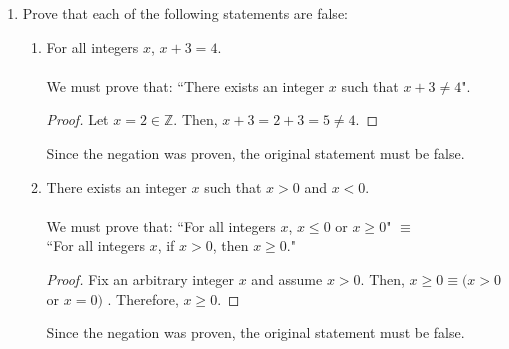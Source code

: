 \documentclass{article}
\begin{document}
\begin{enumerate}
\begin{enumerate}
    			\item There exists an integer $x$ such that, for all integers $y$, $y + x = y$.
                        \begin{proof}
                            Fix an arbitrary integer $y$. Let $x = 0 \in \mathbb{Z}$. Then,
                            \begin{alignat*}{2}
                                x &= y + (\minus y)         &\qquad &\textrm{by Axiom 1d.}  \\
                                \textrm{Hence, } x + y &= y + (\minus y) + y &\qquad &\textrm{by adding '$y$' to both sides}\\
                                x + y &= y + 0              &\qquad &\textrm{by Axiom 1d}  \\
                                x + y &= y                  &\qquad &\textrm{by Axiom 1c}  \\
                                y + x &= y                  &\qquad &\textrm{by Axiom 1a.}  
                            \end{alignat*}
                        \end{proof}
                        
    		\end{enumerate}

    	\item Prove that each of the following statements are false:
    		\begin{enumerate}

    			\item For all integers $x$, $x + 3 = 4$. \\\\
                    We must prove that: ``There exists an integer $x$ such that $x + 3 \ne 4$".
                        \begin{proof}
                            Let $x = 2 \in \mathbb{Z}$. Then, $x + 3 = 2 + 3 = 5 \ne 4$. 
                        \end{proof}
                    Since the negation was proven, the original statement must be false.

    			\item There exists an integer $x$ such that $x > 0$ and $x < 0$. \\\\
                    We must prove that: ``For all integers $x$, $x \le 0$ or $x \ge 0$" $\equiv$\\ ``For all integers $x$, if $x > 0$, then $x \ge 0$." 
                        \begin{proof}
                            Fix an arbitrary integer $x$ and assume $x > 0$. Then, $x \ge 0 \equiv (x > 0$ or $ x = 0)$ . Therefore, $x \ge 0$.
                        \end{proof}
                    Since the negation was proven, the original statement must be false.


\end{enumerate}
\end{enumerate}
\end{document}
